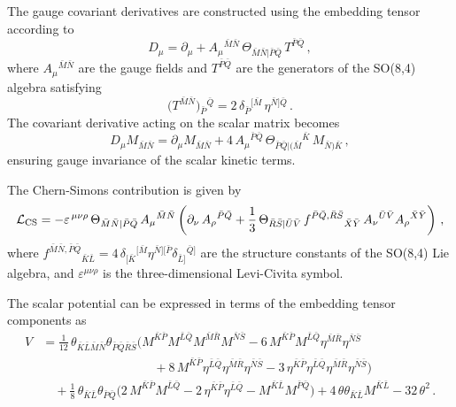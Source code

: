 \documentclass[11pt,a4paper]{article}
\newcommand{\bK}{{\bar{K}}}
\newcommand{\bL}{{\bar{L}}}
\newcommand{\bM}{{\bar{M}}}
\newcommand{\bN}{{\bar{N}}}
\newcommand{\bP}{{\bar{P}}}
\newcommand{\bQ}{{\bar{Q}}}
\newcommand{\bR}{{\bar{R}}}
\newcommand{\bS}{{\bar{S}}}
\begin{document}
The gauge covariant derivatives are constructed using the embedding tensor according to
%
\begin{equation}
	D_\mu =\partial_\mu + A_\mu{}^{\bM\bN}\,\Theta_{\bM\bN\vert\bP\bQ}\, T^{\bP\bQ}\,,
\end{equation}
%
where $A_\mu{}^{\bM\bN}$ are the gauge fields and $T^{\bP\bQ}$ are the generators of the SO(8,4) algebra satisfying
%
\begin{equation} \label{eq:so84gen_rephrased}
	\big(T^{\bar M\bar N}\big){}_{\bar P}{}^{\bar Q} = 2\,\delta_{\bar P}{}^{[\bar M}\,\eta^{\bar N]\bar Q}\,.
\end{equation}
%
The covariant derivative acting on the scalar matrix becomes
%
\begin{equation}
	D_\mu M_{\bM\bN}=\partial_\mu M_{\bM\bN}+4\,A_\mu{}^{\bP\bQ}\,\Theta_{\bP\bQ\vert(\bM}{}^{\bK}\, M_{\bN)\bK}\,,
\end{equation}
%
ensuring gauge invariance of the scalar kinetic terms.

The Chern-Simons contribution is given by
%
\begin{equation}
	{\cal L}_{\rm CS}= -\varepsilon^{\,\mu\nu\rho}\,\Theta_{\bar M\bar N|\bar P\bar Q}\,A_{\mu}{}^{\bar M\bar N}\left(\partial_{\nu}\,A_{\rho}{}^{\bar P\bar Q}  + \frac{1}{3}\, \Theta_{\bar R\bar S|\bar U\bar V}\,f^{\bar P\bar Q,\bar R\bar S}{}_{\bar X\bar Y}\, A_{\nu}{}^{\bar U\bar V} A_{\rho}{}^{\bar X\bar Y} \right)\,,
\end{equation}
%
where $f^{\bar M\bar N,\bar P\bar Q}{}_{\bar K\bar L} = 4\,\delta_{[\bar K}{}^{[\bar M}\eta^{\bar N][\bar P}\delta_{\bar L]}{}^{\bar Q]}$ are the structure constants of the SO(8,4) Lie algebra, and $\varepsilon^{\mu\nu\rho}$ is the three-dimensional Levi-Civita symbol.

The scalar potential can be expressed in terms of the embedding tensor components as
%
{\setlength\arraycolsep{1.2pt}
	\begin{equation}	\label{eq: scalarpot_rephrased}
		\begin{aligned}
			V	&=	\frac1{12}\,\theta_{\bK\bL\bM\bN}\theta_{\bP\bQ\bR\bS}\Big(M^{\bK\bP}M^{\bL\bQ}M^{\bM\bR}M^{\bN\bS}-6\,M^{\bK\bP}M^{\bL\bQ}\eta^{\bM\bR}\eta^{\bN\bS}\\
			&\qquad\qquad\qquad\qquad\quad+8\,M^{\bK\bP}\eta^{\bL\bQ}\eta^{\bM\bR}\eta^{\bN\bS}-3\,\eta^{\bK\bP}\eta^{\bL\bQ}\eta^{\bM\bR}\eta^{\bN\bS}\Big)\\
			&\quad +\frac1{8}\,\theta_{\bK\bL}\theta_{\bP\bQ}\Big(2\,M^{\bK\bP}M^{\bL\bQ}-2\,\eta^{\bK\bP}\eta^{\bL\bQ}-M^{\bK\bL}M^{\bP\bQ}\Big)+4\,\theta\theta_{\bK\bL}M^{\bK\bL}-32\,\theta^2\,.
		\end{aligned}
	\end{equation}
}
\end{document}
